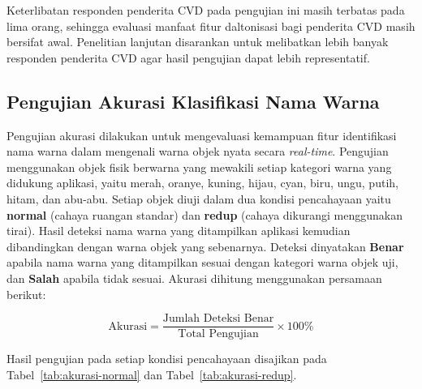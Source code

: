Keterlibatan responden penderita CVD pada pengujian ini masih terbatas pada lima orang, sehingga evaluasi manfaat fitur daltonisasi bagi penderita CVD masih bersifat awal.
Penelitian lanjutan disarankan untuk melibatkan lebih banyak responden penderita CVD agar hasil pengujian dapat lebih representatif.

\subsection{Pengujian Akurasi Klasifikasi Nama Warna}

Pengujian akurasi dilakukan untuk mengevaluasi kemampuan fitur identifikasi nama warna dalam mengenali warna objek nyata secara \textit{real-time}.
Pengujian menggunakan objek fisik berwarna yang mewakili setiap kategori warna yang didukung aplikasi, yaitu merah, oranye, kuning, hijau, cyan, biru, ungu, putih, hitam, dan abu-abu.
Setiap objek diuji dalam dua kondisi pencahayaan yaitu \textbf{normal} (cahaya ruangan standar) dan \textbf{redup} (cahaya dikurangi menggunakan tirai).
Hasil deteksi nama warna yang ditampilkan aplikasi kemudian dibandingkan dengan warna objek yang sebenarnya.
Deteksi dinyatakan \textbf{Benar} apabila nama warna yang ditampilkan sesuai dengan kategori warna objek uji, dan \textbf{Salah} apabila tidak sesuai.
Akurasi dihitung menggunakan persamaan berikut:

\begin{equation}
  \text{Akurasi} = \frac{\text{Jumlah Deteksi Benar}}{\text{Total Pengujian}} \times 100\%
  \label{eq:akurasi}
\end{equation}

Hasil pengujian pada setiap kondisi pencahayaan disajikan pada Tabel~\ref{tab:akurasi-normal} dan Tabel~\ref{tab:akurasi-redup}.


